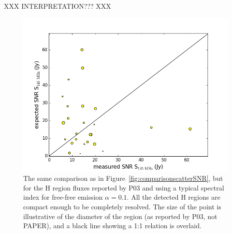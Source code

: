 \documentclass[useAMS,usenatbib]{mn2e}
\begin{document}
XXX INTERPRETATION??? XXX

\begin{figure}
\centering
\includegraphics[width=\columnwidth]{figs/PaladiniScatter.png}
\caption{The same comparison as in Figure~\ref{fig:comparisonscatterSNR}, but for the H{} region fluxes reported by P03 and using a typical spectral index for free-free emission $\alpha=0.1$. All the detected H{} regions are compact enough to be completely resolved. The size of the point is illustrative of the diameter of the region (as reported by P03, not PAPER), and a black line showing a 1:1 relation is overlaid.}
\label{fig:comparisonscatterHii}
\end{figure}
\end{document}
